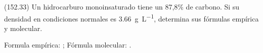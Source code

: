   \begin{solution}
  \end{solution}




  \begin{exercise}[
      tags    = {},
      topics  = {química, química orgánica, orgánica},
      source  = {FQ 1B MGH 2016, p152, e33},
    ]
    (152.33) Un hidrocarburo monoinsaturado tiene un 87,8\% de carbono.
    Si su densidad en condiciones normales es \SI{3,66}{\gram\per\liter}, determina sus fórmulas empírica y molecular.
  \end{exercise}

  \begin{solution}
    Formula empírica: ; Fórmula molecular: .
  \end{solution}
